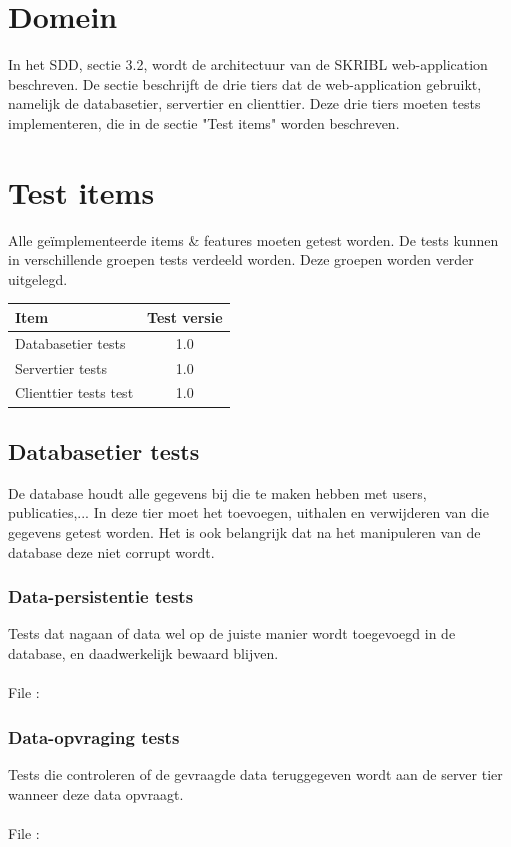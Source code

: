 \documentclass{article}
\begin{document}
\section{Domein}
In het SDD, sectie 3.2, wordt de architectuur van de SKRIBL web-application beschreven. De sectie beschrijft de drie tiers dat de web-application gebruikt, namelijk de databasetier, servertier en clienttier. Deze drie tiers moeten tests implementeren, die in de sectie "Test items" worden beschreven.

\section{Test items}

Alle ge\"implementeerde items \& features moeten getest worden. De tests kunnen in verschillende groepen tests verdeeld worden. Deze groepen worden verder uitgelegd.

\begin{table}[h]
\begin{tabular}{l | c }
 Item&Test versie\\
 \hline
 Databasetier tests&1.0\\
 Servertier tests&1.0\\
 Clienttier tests test&1.0\\
\end{tabular}
\end{table}

\subsection{Databasetier tests}
De database houdt alle gegevens bij die te maken hebben met users, publicaties,... In deze tier moet het toevoegen, uithalen en verwijderen van die gegevens getest worden. Het is ook belangrijk dat na het manipuleren van de database deze niet corrupt wordt.

\subsubsection{Data-persistentie tests}
Tests dat nagaan of data wel op de juiste manier wordt toegevoegd in de database, en daadwerkelijk bewaard blijven.
\\
\\
File : 
\subsubsection{Data-opvraging tests}
Tests die controleren of de gevraagde data teruggegeven wordt aan de server tier wanneer deze data opvraagt.
\\
\\
File :
\end{document}
